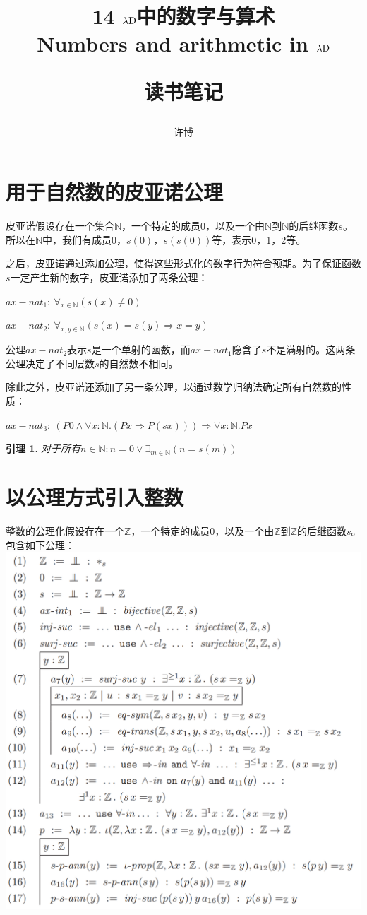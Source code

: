 \documentclass[UTF8]{article}
\title{14 $\lambda{\rm D}$中的数字与算术\\Numbers and arithmetic in $\lambda{\rm D}$\\[2ex]\begin{large}读书笔记\end{large}}
\author{许博}
\date{}
\newtheorem{lemma}[thm]{引理}
\begin{document}
\maketitle
	\section{用于自然数的皮亚诺公理}
	\noindent
	皮亚诺假设存在一个集合$\mathbb{N}$，一个特定的成员0，以及一个由$\mathbb{N}$到$\mathbb{N}$的后继函数$s$。所以在$\mathbb{N}$中，我们有成员0，$s(0)$，$s(s(0))$等，表示0，1，2等。
	
		之后，皮亚诺通过添加公理，使得这些形式化的数字行为符合预期。为了保证函数$s$一定产生新的数字，皮亚诺添加了两条公理：
		
		$ax{-}nat_1:\ \forall_{x\in\mathbb{N}}(s(x)\not=0)$
		
		$ax{-}nat_2:\ \forall_{x,y\in\mathbb{N}}(s(x)=s(y)\Rightarrow x=y)$
		
		公理$ax{-}nat_2$表示$s$是一个单射的函数，而$ax{-}nat_1$隐含了$s$不是满射的。这两条公理决定了不同层数$s$的自然数不相同。
		
		除此之外，皮亚诺还添加了另一条公理，以通过数学归纳法确定所有自然数的性质：
		
		$ax{-}nat_3:\ (P0\land\forall x:\mathbb{N}.(Px\Rightarrow P(sx)))\Rightarrow\forall x:\mathbb{N}.Px$
		
		\begin{lemma} 对于所有$n\in\mathbb{N}:n=0\lor\exists_{m\in\mathbb{N}}(n=s(m))$
		\end{lemma}
	
	\section{以公理方式引入整数}
	\noindent
	整数的公理化假设存在一个$\mathbb{Z}$，一个特定的成员0，以及一个由$\mathbb{Z}$到$\mathbb{Z}$的后继函数$s$。包含如下公理：\\
	\includegraphics[width=0.93\linewidth]{"../imgs/14-1.png"}
		
\end{document}
